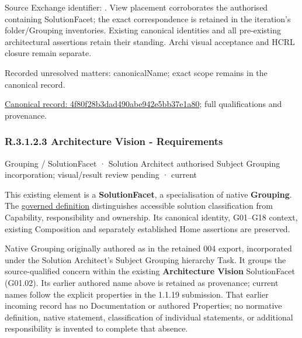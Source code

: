 Source Exchange identifier: \texttt{}. View placement corroborates
the authorised containing SolutionFacet; the exact correspondence is retained in the
iteration's folder/Grouping inventories. Existing canonical identities and all
pre-existing architectural assertions retain their standing. Archi visual
acceptance and HCRL closure remain separate.


{\small Recorded unresolved matters: canonicalName; exact scope remains in the canonical record.}\par
{\footnotesize \href{../../../../../../../continuum/grouping/4f80f28b3dad490abe942e5bb37e1a80.md}{Canonical record: 4f80f28b3dad490abe942e5bb37e1a80}; full qualifications and provenance.}\par
\subsubsection*{R.3.1.2.3 Architecture Vision - Requirements}
\label{navigation:R.3.1.2.3}

\label{element:eabbd522676448fcb075f7d4b5ef4434}
{\small Grouping / SolutionFacet · Solution Architect authorised Subject Grouping incorporation; visual/result review pending · current}\par

This existing element is a \textbf{SolutionFacet}, a specialisation of native
\textbf{Grouping}. The \href{\detokenize{../../../../../../../governance/continuum-representation.md#solutionfacet-classification--1119-candidate}}{governed definition}
distinguishes accessible solution classification from Capability, responsibility
and ownership. Its canonical identity, G01–G18 context, existing Composition
and separately established Home assertions are preserved.



Native Grouping originally authored as \texttt{} in the retained 004 export,
incorporated under the Solution Architect's Subject Grouping hierarchy Task.
It groups the source-qualified \texttt{} concern within
the existing \textbf{Architecture Vision} SolutionFacet (G01.02). Its earlier authored name above is retained as provenance; current names
follow the explicit properties in the 1.1.19 submission.
That earlier incoming record has no Documentation or authored Properties; no normative
definition, native statement, classification of individual statements, or
additional responsibility is invented to complete that absence.



